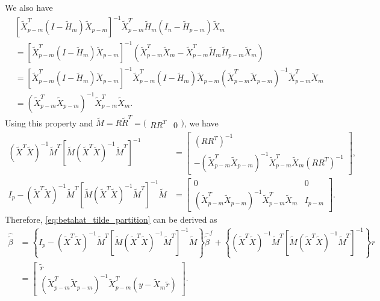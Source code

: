 We also have 
\begin{equation*}
\begin{aligned}
& \left[\tilde{X}_{p-m}^T \left(I-\tilde{H}_m\right) \tilde{X}_{p-m} \right]^{-1} \tilde{X}_{p-m}^T \tilde{H}_m \left(I_n - \tilde{H}_{p-m}\right)\tilde{X}_m \\
&= \left[\tilde{X}_{p-m}^T \left(I-\tilde{H}_m\right) \tilde{X}_{p-m} \right]^{-1} \left( \tilde{X}_{p-m}^T \tilde{X}_m - \tilde{X}_{p-m}^T \tilde{H}_m\tilde{H}_{p-m}\tilde{X}_m \right)  \\
&= \left[\tilde{X}_{p-m}^T \left(I-\tilde{H}_m\right) \tilde{X}_{p-m} \right]^{-1} \tilde{X}_{p-m}^T \left(I-\tilde{H}_m\right) \tilde{X}_{p-m} \left(\tilde{X}_{p-m}^T \tilde{X}_{p-m} \right)^{-1} \tilde{X}_{p-m}^T \tilde{X}_m  \\
&= \left(\tilde{X}_{p-m}^T \tilde{X}_{p-m} \right)^{-1} \tilde{X}_{p-m}^T \tilde{X}_m.
\end{aligned}
\end{equation*}
Using this property and $\tilde{M} = R \tilde{R}^T = \big(\begin{smallmatrix}
  RR^T & 0
\end{smallmatrix}\big)$, we have
\begin{equation*}
\begin{aligned}
\left(\tilde{X}^T \tilde{X}\right)^{-1} \tilde{M}^T \left[ \tilde{M} \left( \tilde{X}^T \tilde{X} \right)^{-1} \tilde{M}^T \right]^{-1} &= 
\begin{bmatrix}
(RR^T)^{-1} \\
-\left(\tilde{X}_{p-m}^T \tilde{X}_{p-m} \right)^{-1} \tilde{X}_{p-m}^T \tilde{X}_m (RR^T)^{-1}
\end{bmatrix},
 \\ 
I_p - \left(\tilde{X}^T \tilde{X}\right)^{-1} \tilde{M}^T \left[ \tilde{M} \left( \tilde{X}^T \tilde{X} \right)^{-1} \tilde{M}^T \right]^{-1} \tilde{M} &= 
\begin{bmatrix}
0 & 0\\
\left(\tilde{X}_{p-m}^T \tilde{X}_{p-m} \right)^{-1} \tilde{X}_{p-m}^T \tilde{X}_m & I_{p-m}
\end{bmatrix}.
\end{aligned}
\end{equation*}
Therefore, \eqref{eq:betahat_tilde_partition} can be derived as
\begin{equation*}
\begin{aligned}
\hat{\tilde{\beta}} &= \left\{I_p - \left(\tilde{X}^T \tilde{X}\right)^{-1} \tilde{M}^T \left[ \tilde{M} \left( \tilde{X}^T \tilde{X} \right)^{-1} \tilde{M}^T \right]^{-1} \tilde{M} \right\}\hat{\tilde{\beta}}^f + \left\{\left(\tilde{X}^T \tilde{X}\right)^{-1} \tilde{M}^T \left[ \tilde{M} \left( \tilde{X}^T \tilde{X} \right)^{-1} \tilde{M}^T \right]^{-1} \right\}r\\
&=
\begin{bmatrix}
\tilde{r}\\
\left(\tilde{X}_{p-m}^T \tilde{X}_{p-m} \right)^{-1} \tilde{X}_{p-m}^T \left(y - \tilde{X}_m \tilde{r}\right)
\end{bmatrix}.
\end{aligned}
\end{equation*}


